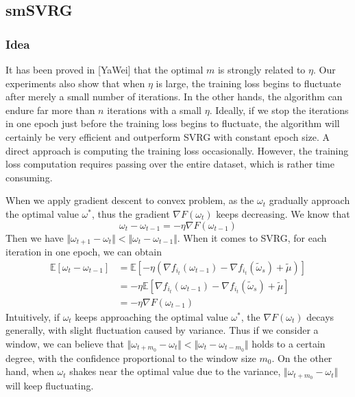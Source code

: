 \documentclass[conference]{IEEEtran}
\begin{document}
 \subsection{smSVRG}
 \subsubsection{Idea}
 It has been proved in [YaWei] that the optimal $m$ is strongly related to $\eta$. Our experiments also show that when $\eta$ is large, the training loss begins to fluctuate after merely a small number of iterations. In the other hands, the algorithm can endure far more than $n$ iterations with a small $\eta$. Ideally, if we stop the iterations in one epoch just before the training loss begins to fluctuate, the algorithm will certainly be very efficient and outperform SVRG with constant epoch size. A direct approach is computing the training loss occasionally. However, the training loss computation requires passing over the entire dataset, which is rather time consuming. 

 When we apply gradient descent to convex problem, as the $\omega_t$ gradually approach the optimal value $\omega^*$, thus the gradient $\nabla F(\omega_t)$ keeps decreasing. We know that
 $$\omega_t - \omega_{t-1} = -\eta\nabla F(\omega_{t-1})$$
 Then we have $\Vert\omega_{t+1}-\omega_t\Vert<\Vert\omega_{t}-\omega_{t-1}\Vert$. 
When it comes to SVRG, for each iteration in one epoch, we can obtain
 \begin{equation}
\label{sgdinequality}
\begin{split}
\mathbb{E}[\omega_t -\omega_{t-1}] &=  \mathbb{E}[- \eta(\nabla f_{i_t}(\omega_{t-1}) - \nabla f_{i_t}(\tilde{\omega}_s)+\tilde{\mu})]\\
&=-\eta\mathbb{E}[\nabla f_{i_t}(\omega_{t-1}) - \nabla f_{i_t}(\tilde{\omega}_s)+\tilde{\mu}]\\
&=-\eta\nabla F(\omega_{t-1})
\end{split}
\end{equation}
 Intuitively, if $\omega_t$ keeps approaching the optimal value $\omega^*$, the $\nabla F(\omega_{t})$ decays generally, with slight fluctuation caused by variance. Thus if we consider a window, we can believe that $\Vert\omega_{t+m_0}-\omega_t\Vert<\Vert\omega_{t}-\omega_{t-m_0}\Vert$ holds to a certain degree, with the confidence proportional to the window size $m_0$. 
 On the other hand, when $\omega_t$ shakes near the optimal value due to the variance, $\Vert\omega_{t+m_0}-\omega_t\Vert$ will keep fluctuating. 
\end{document}
